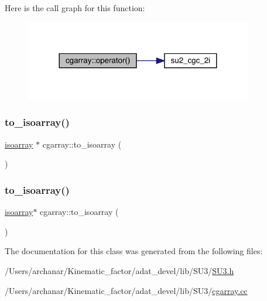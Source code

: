 Here is the call graph for this function\+:\nopagebreak
\begin{figure}[H]
\begin{center}
\leavevmode
\includegraphics[width=281pt]{d7/d55/classcgarray_ad55c1e537d3070a732d9355ed351d53e_cgraph}
\end{center}
\end{figure}
\mbox{\label{classcgarray_af65861dda6c89fcaed8b73a40dfe88a6}} 
\subsubsection{\texorpdfstring{to\_isoarray()}{to\_isoarray()}\hspace{0.1cm}{\footnotesize\ttfamily [1/2]}}
{\footnotesize\ttfamily \mbox{\hyperlink{classisoarray}{isoarray}} $\ast$ cgarray\+::to\+\_\+isoarray (\begin{DoxyParamCaption}{ }\end{DoxyParamCaption})}

\mbox{\label{classcgarray_ade5be135cf4078de471bfb31497b0efa}} 
\subsubsection{\texorpdfstring{to\_isoarray()}{to\_isoarray()}\hspace{0.1cm}{\footnotesize\ttfamily [2/2]}}
{\footnotesize\ttfamily \mbox{\hyperlink{classisoarray}{isoarray}}$\ast$ cgarray\+::to\+\_\+isoarray (\begin{DoxyParamCaption}{ }\end{DoxyParamCaption})}



The documentation for this class was generated from the following files\+:\begin{DoxyCompactItemize}
\item 
/\+Users/archanar/\+Kinematic\+\_\+factor/adat\+\_\+devel/lib/\+S\+U3/\mbox{\hyperlink{lib_2SU3_2SU3_8h}{S\+U3.\+h}}\item 
/\+Users/archanar/\+Kinematic\+\_\+factor/adat\+\_\+devel/lib/\+S\+U3/\mbox{\hyperlink{cgarray_8cc}{cgarray.\+cc}}\end{DoxyCompactItemize}
